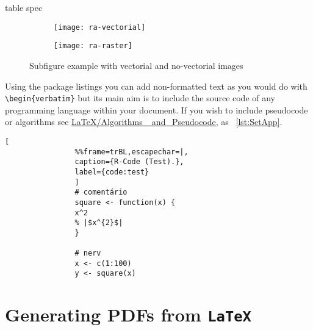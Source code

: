 \begin{tabular}[pos]{table spec}
            \begin{figure}[htbp]
                \centering
                \begin{subfigure}[b]{0.4\textwidth}
                    \centering
                    \texttt{[image: ra-vectorial]}
                    \caption{}
                    \label{fig:ra-vectorial}
                \end{subfigure}
                \qquad\qquad
                \begin{subfigure}[b]{0.4\textwidth}
                    \centering
                    \texttt{[image: ra-raster]}
                    \caption{}
                    \label{fig:ra-raster}
                \end{subfigure}
                \caption{Subfigure example with vectorial and no-vectorial images}
                \label{fig:figura-completa}
            \end{figure}

            Using the package listings you can add non-formatted text as you would do with \verb!\begin{verbatim}! but its main aim is to include the source code of any programming language within your document. If you wish to include pseudocode or algorithms see \href{http://en.wikibooks.org/wiki/LaTeX/Algorithms_and_Pseudocode}{LaTeX/Algorithms\_ and\_Pseudocode}, as \lstlistingname ~\ref{lst:SetApp}.


            \begin{minipage}{\textwidth}
                \lstset{language=R,numbers=left}
                \begin{lstlisting}[
                %%frame=trBL,escapechar=|,
                caption={R-Code (Test).},
                label={code:test}
                ]
                # comentário
                square <- function(x) {
                x^2
                % |$x^{2}$|
                }

                # nerv
                x <- c(1:100)
                y <- square(x)
            \end{lstlisting}
\end{minipage}


\section{Generating PDFs from \texttt{LaTeX}} %
\label{sec:generating_pdfs_from_latex}


\end{tabular}
